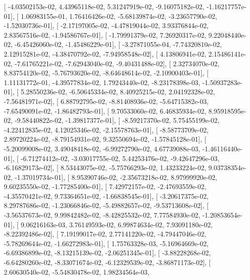 \documentclass{article}
\begin{document}
       [ -4.03502153e-02,   4.43965118e-02,   5.31247919e-02,
         -9.16075182e-02,  -1.16217757e-01],
       [  1.06983155e-01,   1.76416426e-02,  -5.68139874e-02,
         -3.23657790e-02,  -1.52030736e-01],
       [ -2.17197005e-02,  -4.47819044e-02,   3.93376844e-02,
          2.83567516e-02,  -1.94586767e-01],
       [ -1.79991379e-02,   7.26920317e-02,   9.22048440e-02,
         -6.45426060e-02,  -1.45486229e-01],
       [ -3.27871055e-04,  -7.74320810e-02,   2.12915281e-02,
         -4.38470792e-02,  -7.94958548e-02],
       [  4.13806941e-02,   2.15486141e-02,  -7.61765221e-02,
         -7.62943040e-02,  -9.40431488e-02],
       [  2.32734070e-02,   8.83754120e-02,  -5.76793620e-02,
         -8.64648614e-02,  -2.10900403e-01],
       [  1.11131772e-01,  -4.39577834e-02,   1.79243440e-02,
         -8.23178398e-03,  -1.50937283e-01],
       [  5.28550236e-02,  -6.50645334e-02,   8.40925215e-02,
          2.04192328e-02,  -7.56481971e-02],
       [  6.88792795e-02,  -8.81408936e-02,  -5.64715382e-03,
         -7.65490091e-02,  -1.86482793e-01],
       [  9.70533060e-02,   6.46835934e-02,   8.95918595e-02,
         -9.58440822e-02,  -1.39817377e-01],
       [ -8.59217370e-02,   5.75455199e-02,  -4.22412835e-02,
          4.12025346e-02,  -2.15578763e-01],
       [ -8.58773709e-02,   2.89720224e-02,  -8.79154931e-02,
          9.32550694e-02,  -1.57845128e-01],
       [ -5.20099008e-02,   3.49048418e-02,  -6.99272790e-02,
          4.67739088e-03,  -1.46116440e-01],
       [ -6.71274412e-02,  -3.03017755e-02,   5.44253476e-02,
         -9.42647296e-03,  -6.16829173e-02],
       [  8.53443075e-02,  -5.75766293e-02,   1.43233224e-02,
          9.03738354e-02,  -1.37019734e-01],
       [  8.95390746e-02,  -2.35673218e-02,   8.97999920e-02,
          9.60235550e-02,  -1.77285400e-01],
       [  7.42972157e-02,  -2.47693559e-02,  -4.35570421e-02,
          9.73364651e-02,  -1.66838545e-01],
       [ -3.20617375e-02,   8.29787686e-02,  -1.23066846e-02,
         -5.49882657e-02,  -9.53713608e-02],
       [ -3.56537673e-02,   9.99842482e-02,  -8.42825532e-02,
          7.77584930e-02,  -1.20853654e-01],
       [  9.06216163e-03,   3.76149593e-02,   6.99874634e-02,
          7.93091180e-02,  -8.22392486e-02],
       [  7.19199017e-02,   2.77141220e-02,  -4.79447046e-02,
         -5.78269644e-02,  -1.66272983e-01],
       [  1.75763328e-03,  -5.16964669e-02,  -6.69386899e-02,
         -8.13215139e-02,  -2.06251345e-01],
       [ -3.88228268e-02,  -6.64280260e-02,  -8.33071674e-02,
         -6.12329539e-02,  -3.86871173e-02],
       [  2.60630540e-02,  -5.54830478e-02,   1.98234564e-03,
\end{document}

